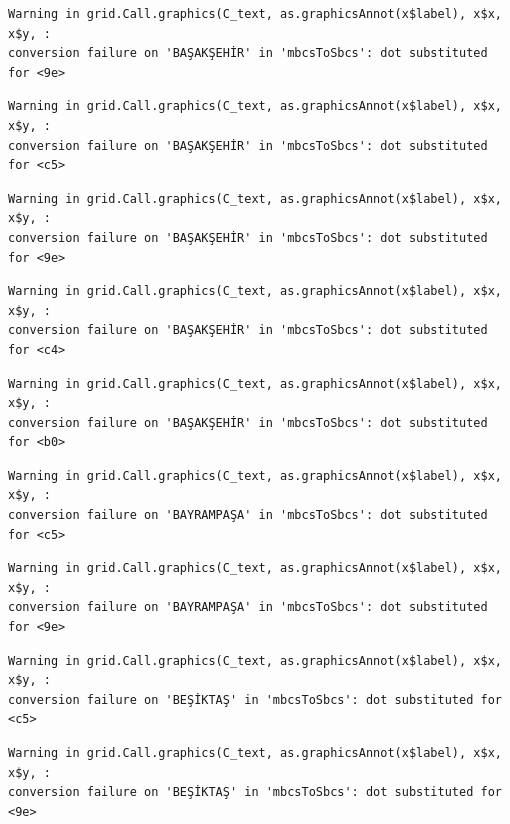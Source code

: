\documentclass[
  11pt,
  a4paper,
  DIV=11,
  numbers=noendperiod]{scrartcl}
\begin{document}
\begin{verbatim}
Warning in grid.Call.graphics(C_text, as.graphicsAnnot(x$label), x$x, x$y, :
conversion failure on 'BAŞAKŞEHİR' in 'mbcsToSbcs': dot substituted for <9e>
\end{verbatim}

\begin{verbatim}
Warning in grid.Call.graphics(C_text, as.graphicsAnnot(x$label), x$x, x$y, :
conversion failure on 'BAŞAKŞEHİR' in 'mbcsToSbcs': dot substituted for <c5>
\end{verbatim}

\begin{verbatim}
Warning in grid.Call.graphics(C_text, as.graphicsAnnot(x$label), x$x, x$y, :
conversion failure on 'BAŞAKŞEHİR' in 'mbcsToSbcs': dot substituted for <9e>
\end{verbatim}

\begin{verbatim}
Warning in grid.Call.graphics(C_text, as.graphicsAnnot(x$label), x$x, x$y, :
conversion failure on 'BAŞAKŞEHİR' in 'mbcsToSbcs': dot substituted for <c4>
\end{verbatim}

\begin{verbatim}
Warning in grid.Call.graphics(C_text, as.graphicsAnnot(x$label), x$x, x$y, :
conversion failure on 'BAŞAKŞEHİR' in 'mbcsToSbcs': dot substituted for <b0>
\end{verbatim}

\begin{verbatim}
Warning in grid.Call.graphics(C_text, as.graphicsAnnot(x$label), x$x, x$y, :
conversion failure on 'BAYRAMPAŞA' in 'mbcsToSbcs': dot substituted for <c5>
\end{verbatim}

\begin{verbatim}
Warning in grid.Call.graphics(C_text, as.graphicsAnnot(x$label), x$x, x$y, :
conversion failure on 'BAYRAMPAŞA' in 'mbcsToSbcs': dot substituted for <9e>
\end{verbatim}

\begin{verbatim}
Warning in grid.Call.graphics(C_text, as.graphicsAnnot(x$label), x$x, x$y, :
conversion failure on 'BEŞİKTAŞ' in 'mbcsToSbcs': dot substituted for <c5>
\end{verbatim}

\begin{verbatim}
Warning in grid.Call.graphics(C_text, as.graphicsAnnot(x$label), x$x, x$y, :
conversion failure on 'BEŞİKTAŞ' in 'mbcsToSbcs': dot substituted for <9e>
\end{verbatim}
\end{document}
